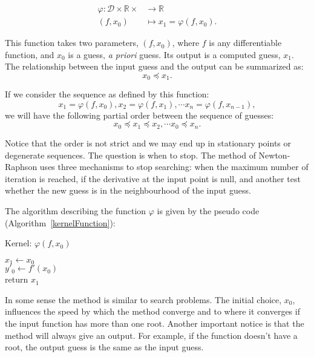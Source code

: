 \documentclass[12pt]{article}
\begin{document}
  \begin{align} \label{eq:functional}
   \varphi \colon  \mathcal{D} \times \mathbb{R} \times  &\to \mathbb{R} \nonumber\\
   (f,x_0) &\mapsto x_1 = \varphi(f,x_0).
  \end{align}
  
  This function takes two parameters, \( (f, x_0)\), where \(f\) is any differentiable function, and \(x_0\) is a guess, \textit {a priori} guess. Its output is a computed guess, \(x_1\).
  The relationship between the input guess and the output can be summarized as:
  \[
  x_0 \preceq x_1.
  \]
  
  If we consider the sequence as defined by this function:
  \[
  x_1 = \varphi (f,x_0), x_2 = \varphi (f,x_1), \cdots x_n = \varphi (f,x_{n-1}),
  \]
  we will have the following partial order between the sequence of guesses:
  \[
  x_0 \preceq x_1\preceq x_2, \cdots x_0 \preceq x_n.
  \]
  
  Notice that the order is not strict and we may end up in stationary points or degenerate sequences.  The question is when to stop.
  The method of Newton-Raphson uses three mechanisms to stop searching: when the maximum number of iteration is reached,
  if the derivative at the input point is null, and another test whether the new guess is in the neighbourhood  of the input guess.
  
  The algorithm describing the function \( \varphi\) is given by the pseudo code (Algorithm~\ref {kernelFunction}):
  
  \begin{algorithm}[H]
   \caption{Kernel: $\varphi (f,x_0)$}
   \label{kernelFunction}
   	$x_1 \gets x_0 $ \\
  	$y'_0 \gets f'(x_0)$ \\  
  	return $x_1$
  \end{algorithm}
  
  In some sense the method is similar to search problems.  
  The initial choice, \(x_0\), influences the speed by which the method converge and to where it converges if the input function has more than one root.
  Another important notice is that the method will always give an output.  For example, if the function doesn't have a root, the output guess is the same as the input guess.
  
\end{document}
